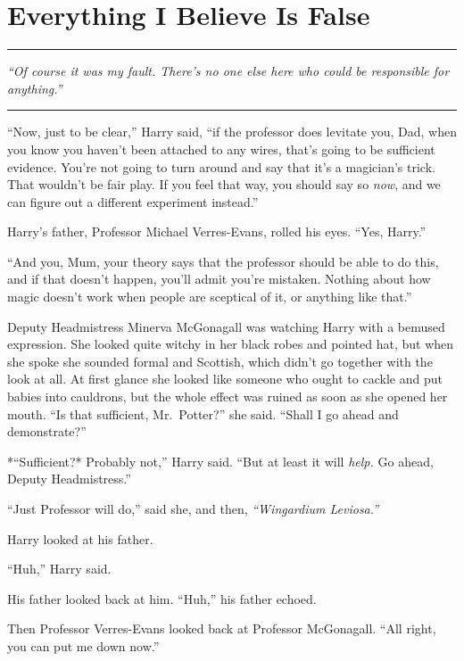 \chapter{Everything I Believe Is False}

\begin{center}\rule{3in}{0.4pt}\end{center}

\emph{``Of course it was my fault. There's no one else here who could be
responsible for anything.''}

\begin{center}\rule{3in}{0.4pt}\end{center}

``Now, just to be clear,'' Harry said, ``if the professor does levitate
you, Dad, when you know you haven't been attached to any wires, that's
going to be sufficient evidence. You're not going to turn around and say
that it's a magician's trick. That wouldn't be fair play. If you feel
that way, you should say so \emph{now}, and we can figure out a
different experiment instead.''

Harry's father, Professor Michael Verres-Evans, rolled his eyes. ``Yes,
Harry.''

``And you, Mum, your theory says that the professor should be able to do
this, and if that doesn't happen, you'll admit you're mistaken. Nothing
about how magic doesn't work when people are sceptical of it, or
anything like that.''

Deputy Headmistress Minerva McGonagall was watching Harry with a bemused
expression. She looked quite witchy in her black robes and pointed hat,
but when she spoke she sounded formal and Scottish, which didn't go
together with the look at all. At first glance she looked like someone
who ought to cackle and put babies into cauldrons, but the whole effect
was ruined as soon as she opened her mouth. ``Is that sufficient,
Mr.~Potter?'' she said. ``Shall I go ahead and demonstrate?''

*``Sufficient?* Probably not,'' Harry said. ``But at least it will
\emph{help.} Go ahead, Deputy Headmistress.''

``Just Professor will do,'' said she, and then, \emph{``Wingardium
Leviosa.''}

Harry looked at his father.

``Huh,'' Harry said.

His father looked back at him. ``Huh,'' his father echoed.

Then Professor Verres-Evans looked back at Professor McGonagall. ``All
right, you can put me down now.''

